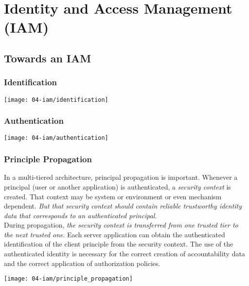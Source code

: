 

\section{Identity and Access Management (IAM)}

\subsection{Towards an IAM}

\subsubsection{Identification}
\begin{center}
    \texttt{[image: 04-iam/identification]}
    \vspace{-8pt}
\end{center}

\subsubsection{Authentication}
\begin{center}
    \texttt{[image: 04-iam/authentication]}
    \vspace{-8pt}
\end{center}

\subsubsection{Principle Propagation}
\begin{minipage}{0.5\linewidth}
    In a multi-tiered architecture, principal propagation is important. Whenever a principal (user or another application) is authenticated, a \textit{security context} is created. That context may be system or environment or even mechanism dependent. \textit{But that security context should contain reliable trustworthy identity data that corresponds to an authenticated principal}.\\

    During propagation, \textit{the security context is transferred from one trusted tier to the next trusted one}. Each server application can obtain the authenticated identification of the client principle from the security context. The use of the authenticated identity is necessary for the correct creation of accountability data and the correct application of authorization policies.\\
\end{minipage}
\begin{minipage}{0.45\linewidth}
    \begin{center}
        \texttt{[image: 04-iam/principle\_propagation]}
        \vspace{-8pt}
    \end{center}
\end{minipage}

